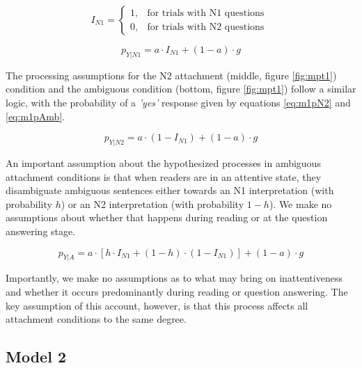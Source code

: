 \documentclass[11pt]{article}\usepackage[]{graphicx}\usepackage[]{color}
\begin{document}
\vspace{-0.5cm}
\begin{equation}
        I_{N1} = 
\begin{cases}
    1, & \text{for trials with N1 questions }\\
    0, & \text{for trials with N2 questions}
\end{cases}
    \label{eq:I_N1}
\end{equation}

\vspace{-0.25cm}
\begin{equation}
    p_{Y|N1} = a \cdot I_{N1} + (1-a) \cdot g
    \label{eq:m1pN1}
\end{equation}

The processing assumptions for the N2 attachment (middle, figure \ref{fig:mpt1}) condition and the ambiguous condition  (bottom, figure \ref{fig:mpt1}) follow a similar logic, with the probability of a \textit{'yes'} response given by equations \ref{eq:m1pN2} and \ref{eq:m1pAmb}. 

\vspace{-0.5cm}
\begin{equation}
    p_{Y|N2} = a \cdot ( 1 - I_{N1} ) + (1-a) \cdot g
    \label{eq:m1pN2}
\end{equation}

An important assumption about the hypothesized processes in ambiguous attachment conditions is that when readers are in an attentive state, they disambiguate ambiguous sentences either towards an N1 interpretation (with probability $h$) or an N2 interpretation (with probability $1-h$). We make no assumptions about whether that happens during reading or at the question answering stage.

\vspace{-0.5cm}
\begin{equation}
    p_{Y|A} = a \cdot   [ h  \cdot I_{N1} + (1 - h) \cdot (1-I_{N1}) ]  + (1-a) \cdot g 
    \label{eq:m1pAmb}
\end{equation}
\vspace{0.1cm}


Importantly, we make no assumptions as to what may bring on inattentiveness and whether it occurs predominantly during reading or question answering. The key assumption of this account, however, is that this process affects all attachment conditions to the same degree. 


\subsection{Model 2}
 
\end{document}
